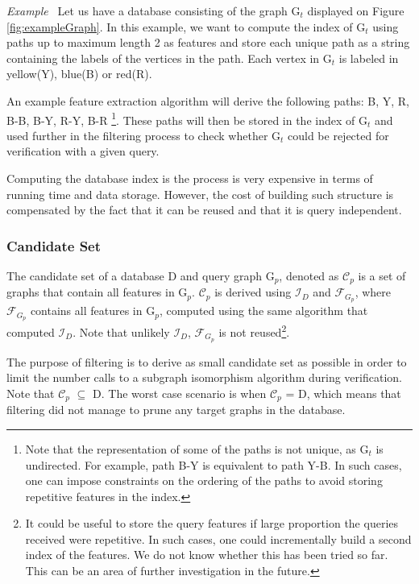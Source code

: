 \documentclass{l4proj}
\newcounter{example}[section]
\newenvironment{example}[1][]{\refstepcounter{example}\par\medskip
   \noindent \textit{Example~\theexample #1} \rmfamily}{\medskip}
\newcommand{\fancyI}{\mathcal{I}}
\newcommand{\fancyC}{\mathcal{C}}
\newcommand{\fancyF}{\mathcal{F}}
\begin{document}
\begin{example}
\label{ex:index}
Let us have a database consisting of the graph G$_{t}$ displayed on Figure \ref{fig:exampleGraph}. In this example, we want to compute the index of G$_{t}$ using paths up to maximum length 2 as features and store each unique path as a string containing the labels of the vertices in the path. Each vertex in G$_{t}$ is labeled in yellow(Y), blue(B) or red(R).

An example feature extraction algorithm will derive the following paths:
B, Y, R, B-B, B-Y, R-Y, B-R \footnote{Note that the representation of some of the paths is not unique, as G$_{t}$ is undirected. For example, path B-Y is equivalent to path Y-B. In such cases, one can impose constraints on the ordering of the paths to avoid storing repetitive features in the index.}. These paths will then be stored in the index of G$_{t}$ and used further in the filtering process to check whether G$_{t}$ could be rejected for verification with a given query.
\end{example}

Computing the database index is the process is very expensive in terms of running time and data storage. However, the cost of building such structure is compensated by the fact that it can be reused and that it is query independent.

\subsubsection{Candidate Set}
The candidate set of a database D and query graph G$_{p}$, denoted as $\fancyC_{p}$ is a set of graphs that contain all features in G$_{p}$. $\fancyC_{p}$ is derived using $\fancyI_{D}$ and $\fancyF_{G_{p}}$, where $\fancyF_{G_{p}}$ contains all features in G$_{p}$, computed using the same algorithm that computed $\fancyI_{D}$. Note that unlikely $\fancyI_{D}$, $\fancyF_{G_{p}}$ is not reused\footnote{It could be useful to store the query features if large proportion the queries received were repetitive. In such cases, one could incrementally build a second index of the features. We do not know whether this has been tried so far. This can be an area of further investigation in the future.}.

The purpose of filtering is to derive as small candidate set as possible in order to limit the number calls to a subgraph isomorphism algorithm during verification. Note that $\fancyC_{p}$ $\subseteq$ D. The worst case scenario is when $\fancyC_{p}$ = D, which means that filtering did not manage to prune any target graphs in the database.
\end{document}
